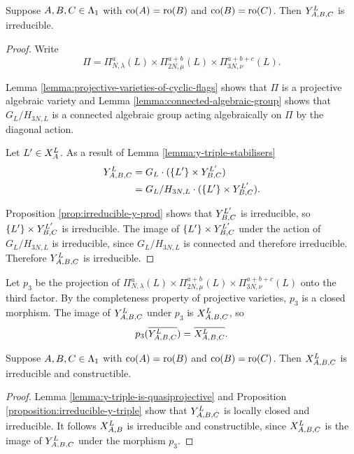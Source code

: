 \documentclass[a4paper, 11pt, twoside]{report}
\begin{document}
\begin{proposition}\label{proposition:irreducible-y-triple}
Suppose $A,B,C\in\matrices$ with $\co{A}=\ro{B}$ and $\co{B}=\ro{C}$. Then $\yprod[L]{A,B,C}$ is irreducible.
\end{proposition}

\begin{proof}
Write
\begin{equation*}
\Pi=\Pi_{N,\lambda}^{a}(L)\times\Pi_{2N,\mu}^{a+b}(L)\times\Pi_{3N,\nu}^{a+b+c}(L).
\end{equation*}

Lemma \ref{lemma:projective-varieties-of-cyclic-flags} shows that $\Pi$ is a projective algebraic variety and Lemma \ref{lemma:connected-algebraic-group} shows that $G_L/{H_{3N,L}}$ is a connected algebraic group acting algebraically on $\Pi$ by the diagonal action.

Let $L'\in\xprod[L]{A}$. As a result of Lemma \ref{lemma:y-triple-stabilisers} 
\begin{align*}
\yprod[L]{A,B,C}
&= G_L\cdot (\{L'\}\times\yprod[L']{B,C})\\
&= G_L/{H_{3N,L}}\cdot (\{L'\}\times\yprod[L']{B,C}).
\end{align*}

Proposition \ref{prop:irreducible-y-prod} shows that $\yprod[L']{B,C}$ is irreducible, so $\{L'\}\times\yprod[L']{B,C}$ is irreducible. The image of $\{L'\}\times\yprod[L']{B,C}$ under the action of $G_L/{H_{3N,L}}$ is irreducible, since $G_L/{H_{3N,L}}$ is connected and therefore irreducible. Therefore $\yprod[L]{A,B,C}$ is irreducible.
\end{proof}

Let $p_3$ be the projection of $\Pi_{N,\lambda}^a(L)\times\Pi_{2N,\mu}^{a+b}(L)\times\Pi_{3N,\nu}^{a+b+c}(L)$ onto the third factor. By the completeness property of projective varieties, $p_3$ is a closed morphism. The image of $\yprod[L]{A,B,C}$ under $p_3$ is $\xprod[L]{A,B,C}$, so
\begin{equation*}
p_3(\overline{\yprod[L]{A,B,C}}) = \overline{\xprod[L]{A,B,C}}.
\end{equation*}

\begin{lemma}\label{lemma:irreducible-x-triple}
Suppose $A,B,C\in\matrices$ with $\co{A}=\ro{B}$ and $\co{B}=\ro{C}$. Then $\xprod[L]{A,B,C}$ is irreducible and constructible.
\end{lemma}

\begin{proof}
Lemma \ref{lemma:y-triple-is-quasiprojective} and Proposition \ref{proposition:irreducible-y-triple} show that $\yprod[L]{A,B,C}$ is locally closed and irreducible. It follows $\xprod[L]{A,B}$ is irreducible and constructible, since $\xprod[L]{A,B,C}$ is the image of $\yprod[L]{A,B,C}$ under the morphism $p_3$.
\end{proof}
\end{document}
